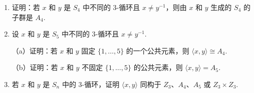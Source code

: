 \begin{enumerate}
\item 证明：若 \(x\) 和 \(y\) 是 \(S_4\) 中不同的 3-循环且 \(x \neq y^{-1}\)，则由 \(x\) 和 \(y\) 生成的 \(S_4\) 的子群是 \(A_4\).

\item 设 \(x\) 和 \(y\) 是 \(S_5\) 中不同的 3-循环且 \(x \neq y^{-1}\).

（a）证明：若 \(x\) 和 \(y\) 固定 \(\{1, \ldots, 5\}\) 的一个公共元素，则 \(\langle x, y \rangle \cong A_4\).

（b）证明：若 \(x\) 和 \(y\) 不固定 \(\{1, \ldots, 5\}\) 的公共元素，则 \(\langle x, y \rangle = A_5\).

\item 若 \(x\) 和 \(y\) 是 \(S_n\) 中的 3-循环，证明 \(\langle x, y \rangle\) 同构于 \(Z_3\)、\(A_4\)、\(A_5\) 或 \(Z_3 \times Z_3\).
\end{enumerate}
